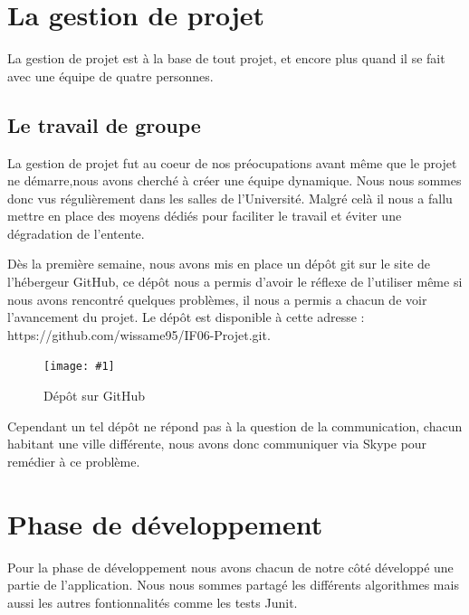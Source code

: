 ﻿\documentclass[a4paper,twoside,12pt]{report}
\newcommand{\monimage}[4]{
\par\noindent
\begin{figure}[H] %
\begin{center}
\texttt{[image: \#1]} %
\caption{#2} %
\label{#3} %
\end{center}
\end{figure} %
}
\begin{document}
\chapter{La gestion de projet}
%
\par
La gestion de projet est à la base de tout projet, et encore plus quand il se 
fait avec une équipe de quatre personnes.
\section{Le travail de groupe}
%
\par
La gestion de projet fut au coeur de nos préocupations avant même que le projet 
ne démarre,nous avons cherché à créer une équipe dynamique. Nous nous sommes 
donc vus régulièrement dans les salles de l'Université. Malgré celà il nous a 
fallu mettre en place des moyens dédiés pour faciliter le travail et éviter une 
dégradation de l'entente.
\par\noindent
 Dès la première semaine, nous avons mis en place un dépôt git sur le site de 
l'hébergeur GitHub, ce dépôt nous a permis d'avoir le réflexe de l'utiliser même 
 si nous avons rencontré quelques problèmes, il nous a permis a chacun de voir 
l'avancement du projet. Le dépôt est disponible à cette adresse : https://github.com/wissame95/IF06-Projet.git.
\monimage{DepotGit.png}{Dépôt sur GitHub}{depot}{0.8}
\par\noindent
 Cependant un tel dépôt ne répond pas à la question de la communication, chacun 
habitant une ville différente, nous avons donc communiquer via Skype pour 
remédier à ce problème.

\chapter{Phase de développement}
%
Pour la phase de développement nous avons chacun de notre côté développé une 
partie de l'application. Nous nous sommes partagé les différents 
algorithmes mais aussi les autres fontionnalités comme les tests Junit.
\end{document}
